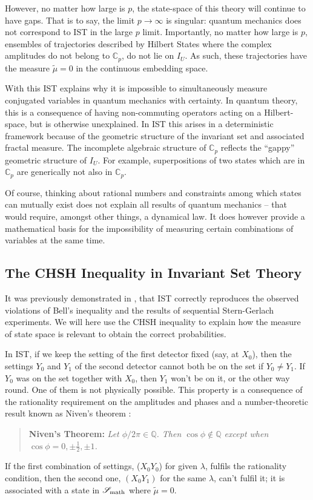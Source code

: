\documentclass{article}
\begin{document}
However, no matter how large is $p$, the state-space of this theory will continue to have gaps. That is to say, the limit $p \rightarrow \infty$ is singular: quantum mechanics does not correspond to {\sc IST} in the large $p$ limit. Importantly, no matter how large is $p$, ensembles of trajectories described by Hilbert States where the complex amplitudes do not belong to $\mathbb C_p$, do not lie on $I_U$. As such, these trajectories have the measure $\tilde \mu=0$ in the continuous embedding space. 

With this {\sc IST} explains why it is impossible to simultaneously measure conjugated variables in quantum mechanics with certainty. In quantum theory, this is a consequence of having non-commuting operators acting on a Hilbert-space, but is otherwise unexplained. In {\sc IST} this arises in a deterministic framework because of the geometric structure of the invariant set and associated fractal measure. The incomplete algebraic structure of ${\mathbb C}_p$ reflects the ``gappy'' geometric structure of $I_U$. For example, superpositions of two states which are in ${\mathbb C}_p$ are generically not also in ${\mathbb C}_p$. 

Of course, thinking about rational numbers and constraints among which states can mutually exist does not explain all results of quantum mechanics -- that would require, amongst other things, a dynamical law. It does however provide a mathematical basis for the impossibility of measuring certain combinations of variables at the same time.


\subsection{The CHSH Inequality in Invariant Set Theory}
\label{CHSHIST}

It was previously demonstrated in \mbox{\cite{Palmer2020Discretization}}, that {\sc IST} correctly reproduces the observed violations of Bell's inequality and the results of sequential Stern-Gerlach experiments. We will here use the {\sc CHSH} inequality to explain how the measure of state space is relevant to obtain the correct probabilities.

In {\sc IST}, if we keep the setting of the first detector fixed (say, at $X_0$), then the settings $Y_0$ and $Y_1$ of the second detector cannot both be on the set if $Y_0 \neq Y_1$. If $Y_0$ was on the set together with $X_0$, then $Y_1$ won't be on it, or the other way round. One of them is not physically possible. This property is a consequence of the rationality requirement on the amplitudes and phases and a number-theoretic result known as Niven's theorem
 \cite{Niven1956irrational,Jahnel2010Sines}:
\begin{quote}
{\bf Niven's Theorem:}
 \emph{Let $\phi/2\pi \in \mathbb{Q}$. Then $\cos \phi \notin \mathbb{Q}$ except when $\cos \phi =0, \pm \frac{1}{2}, \pm 1$.}
\end{quote}
If the first combination of settings, ($X_0Y_0$) for given $\lambda$, fulfils the rationality condition, then the second one, $(X_0Y_1)$ for the same $\lambda$, can't fulfil it; it is associated with a state in ${\mathscr S}_{\rm math}$ where $\tilde \mu=0$. 
\end{document}
